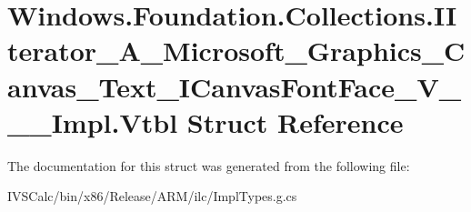 \hypertarget{struct_windows_1_1_foundation_1_1_collections_1_1_i_iterator___a___microsoft___graphics___canvas6bf6b0c66c93b00ae668cf0c8cd0dfb2}{}\section{Windows.\+Foundation.\+Collections.\+I\+Iterator\+\_\+\+A\+\_\+\+Microsoft\+\_\+\+Graphics\+\_\+\+Canvas\+\_\+\+Text\+\_\+\+I\+Canvas\+Font\+Face\+\_\+\+V\+\_\+\+\_\+\+\_\+\+Impl.\+Vtbl Struct Reference}
\label{struct_windows_1_1_foundation_1_1_collections_1_1_i_iterator___a___microsoft___graphics___canvas6bf6b0c66c93b00ae668cf0c8cd0dfb2}


The documentation for this struct was generated from the following file\+:\begin{DoxyCompactItemize}
\item 
I\+V\+S\+Calc/bin/x86/\+Release/\+A\+R\+M/ilc/Impl\+Types.\+g.\+cs\end{DoxyCompactItemize}
